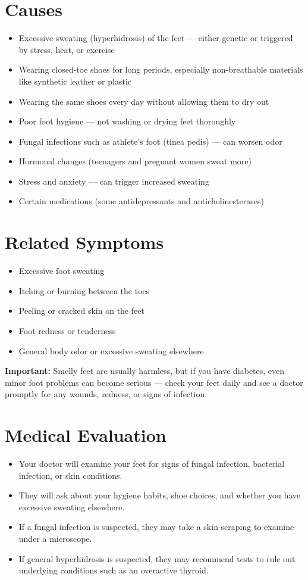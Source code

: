 \section*{Causes}
\begin{itemize}
  \item Excessive sweating (hyperhidrosis) of the feet — either genetic or triggered by stress, heat, or exercise
  \item Wearing closed-toe shoes for long periods, especially non-breathable materials like synthetic leather or plastic
  \item Wearing the same shoes every day without allowing them to dry out
  \item Poor foot hygiene — not washing or drying feet thoroughly
  \item Fungal infections such as athlete's foot (tinea pedis) — can worsen odor
  \item Hormonal changes (teenagers and pregnant women sweat more)
  \item Stress and anxiety — can trigger increased sweating
  \item Certain medications (some antidepressants and anticholinesterases)
\end{itemize}

\section*{Related Symptoms}
\begin{itemize}
  \item Excessive foot sweating
  \item Itching or burning between the toes
  \item Peeling or cracked skin on the feet
  \item Foot redness or tenderness
  \item General body odor or excessive sweating elsewhere
\end{itemize}
\textbf{Important:} Smelly feet are usually harmless, but if you have diabetes, even minor foot problems can become serious — check your feet daily and see a doctor promptly for any wounds, redness, or signs of infection.

\section*{Medical Evaluation}
\begin{itemize}
  \item Your doctor will examine your feet for signs of fungal infection, bacterial infection, or skin conditions.
  \item They will ask about your hygiene habits, shoe choices, and whether you have excessive sweating elsewhere.
  \item If a fungal infection is suspected, they may take a skin scraping to examine under a microscope.
  \item If general hyperhidrosis is suspected, they may recommend tests to rule out underlying conditions such as an overactive thyroid.
\end{itemize}

